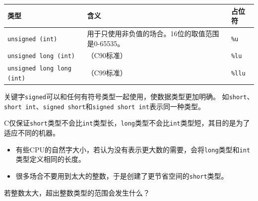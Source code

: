 \begin{frame}[fragile]
  \begin{table}
    \centering
    \begin{tabular}{p{2.8cm}|p{4.4cm}|p{3cm}} \hline
      类型&含义&占位符\\\hline
      \lstinline|unsigned (int)|&  用于只使用非负值的场合。16位的取值范围是0-65535。  & \lstinline|%u|\\[0.1in]\hline
      \lstinline|unsigned long (int)| &   （C90标准）& \lstinline|%lu| \\[0.1in]\hline
      \lstinline|unsigned long long (int)|   & （C99标准） &\lstinline|%llu|\\
      \hline
    \end{tabular}
  \end{table}
\end{frame}
%
\begin{frame}[fragile]
  关键字\lstinline|signed|可以和任何有符号类型一起使用，使数据类型更加明确。
  如\lstinline|short|、\lstinline|short int|、\lstinline|signed short|和\lstinline|signed short int|表示同一种类型。
\end{frame}
%
\begin{frame}[fragile]
C仅保证\lstinline|short|类型不会比\lstinline|int|类型长，\lstinline|long|类型不会比\lstinline|int|类型短，其目的是为了适应不同的机器。\vspace{0.05in}

\begin{itemize}
\item 有些CPU的自然字大小，若认为没有表示更大数的需要，会将\lstinline|long|类型和\lstinline|int|类型定义相同的长度。\\[0.1in]
\item 很多场合不要用到太大的整数，于是创建了更节省空间的\lstinline|short|类型。
\end{itemize}
\end{frame}

\begin{frame}[fragile]
\begin{wenti}
若整数太大，超出整数类型的范围会发生什么？
\end{wenti}
\end{frame}

